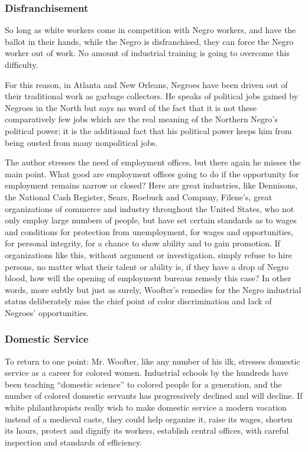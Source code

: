 \documentclass[letterpaper,10pt,english]{jupyterBook}
\begin{document}
\subsubsection{Disfranchisement}
\label{\detokenize{Volumes/38/03/woofterism:disfranchisement}}
\sphinxAtStartPar
So long as white workers come in competition with Negro workers, and have the ballot in their hands, while   the Negro is disfranchised, they can force the Negro worker out of work. No amount of industrial training is going to overcome this difficulty.

\sphinxAtStartPar
For this reason, in Atlanta and New Orleans, Negroes have been driven out of their traditional work as garbage collectors. He speaks of political jobs gained by Negroes in the North but says no word of the fact that it is not these comparatively few jobs which are the real meaning of the Northern Negro’s political power; it is the additional fact that his political power keeps him from being ousted from many non\sphinxhyphen{}political jobs.

\sphinxAtStartPar
The author stresses the need of employment offices, but there again he misses the main point. What good are employment offices going to do if the opportunity for employment remains narrow or closed? Here are great industries, like Dennisons, the National Cash Register, Sears, Roebuck and Company, Filene’s, great organizations of commerce and industry throughout the United States, who not only employ large numbers of people, but have set certain standards as to wages and conditions for protection from unemployment, for wages and opportunities, for personal integrity, for a chance to show ability and to gain promotion. If organizations like this, without argument or investigation, simply refuse to hire persons, no matter what their talent or ability is, if they have a drop of Negro blood, how will the opening of employment bureaus remedy this case? In other words, more subtly but just as surely, Woofter’s remedies for the Negro industrial status deliberately miss the chief point of color discrimination and lack of Negroes’ opportunities.


\subsubsection{Domestic Service}
\label{\detokenize{Volumes/38/03/woofterism:domestic-service}}
\sphinxAtStartPar
To return to one point: Mr. Woofter, like any number of his ilk, stresses domestic service as a career for colored women. Industrial schools by the hundreds have been teaching “domestic science” to colored people for a generation, and the number of colored domestic servants has progressively declined and will decline. If white philanthropists really wish to make domestic service a modern vocation instead of a medieval caste, they could help organize it, raise its wages, shorten its hours, protect and dignify its workers, establish central offices, with careful inspection and standards of efficiency.
\end{document}
